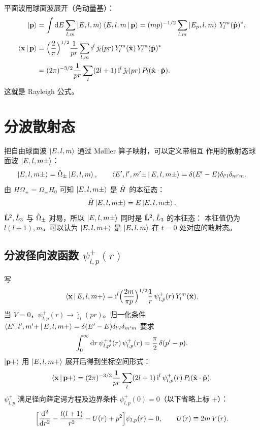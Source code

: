 平面波用球面波展开（角动量基）：
\begin{align}
\ket{\mathbf p}
&= \int\mathrm{d} E\sum_{l,m}\ket{E,l,m}\left\langle E,l,m \,\middle|\, \mathbf p \right\rangle
= (mp)^{-1/2}\sum_{l,m}\ket{E_p,l,m}\,Y_l^m(\hat{\mathbf p})^*,\\
\left\langle \mathbf x \,\middle|\, \mathbf p \right\rangle
&= \Bigl(\frac{2}{\pi}\Bigr)^{1/2}\frac{1}{pr}
\sum_{l,m}\mathrm{i}^l\,\hat\jmath_l(pr)\,Y_l^m(\hat{\mathbf x})\,Y_l^m(\hat{\mathbf p})^*\\
&= (2\pi)^{-3/2}\frac{1}{pr}\sum_l (2l+1)\,\mathrm{i}^l\,
   \hat\jmath_l(pr)\,P_l(\hat{\mathbf x}\cdot\hat{\mathbf p}).
\label{eq:Rayleigh}
\end{align}
这就是 Rayleigh 公式。

\section{分波散射态}\label{sec:pw-states}

把自由球面波 $\ket{E,l,m}$ 通过 Mølller 算子映射，可以定义带相互
作用的散射态球面波 $\ket{E,l,m\pm}$：
\begin{equation}
\ket{E,l,m\pm}=\hat{\Omega}_\pm \ket{E,l,m},
\qquad
\left\langle E',l',m'\pm \,\middle|\, E,l,m\pm \right\rangle=\delta(E'-E)\delta_{l'l}\delta_{m'm}.
\end{equation}
由 $H\Omega_\pm=\Omega_\pm H_0$ 可知 $\ket{E,l,m\pm}$ 是 $\hat{H}$
的本征态：
\[ \hat{H}\ket{E,l,m\pm}=E\ket{E,l,m\pm}.\]
$\hat{\mathbf L}^2,\hat{L}_3$ 与 $\hat{\Omega}_\pm$ 对易，所以
$\ket{E,l,m\pm}$ 同时是 $\hat{\mathbf L}^2,\hat{L}_3$ 的本征态：
本征值仍为 $l(l+1),m$。可以认为 $\ket{E,l,m+}$ 是
$\ket{E,l,m}$ 在 $t=0$ 处对应的散射态。

\subsection{分波径向波函数 $\psi_{l,p}^{+}(r)$}

写
\begin{equation}\label{eq:Elm-plus-x}
\left\langle \mathbf x \,\middle|\, E,l,m+ \right\rangle
= \mathrm{i}^l \Bigl(\frac{2m}{\pi p}\Bigr)^{1/2}\frac{1}{r}\,
   \psi_{l,p}^{+}(r)\,Y_l^m(\hat{\mathbf x}).
\end{equation}
当 $V=0$，$\psi_{l,p}^{+}(r)\to\hat\jmath_l(pr)$。归一化条件
$\left\langle E',l',m'+ \,\middle|\, E,l,m+ \right\rangle=\delta(E'-E)\delta_{l'l}\delta_{m'm}$
要求
\begin{equation}\label{eq:psi-norm}
\int_0^\infty \mathrm{d} r\,\psi_{l,p'}^{+\,*}(r)\,\psi_{l,p}^{+}(r)
=\frac{\pi}{2}\,\delta(p'-p).
\end{equation}
$\ket{\mathbf p+}$ 用 $\ket{E,l,m+}$ 展开后得到坐标空间形式：
\begin{equation}\label{eq:xpplus}
\left\langle \mathbf x \,\middle|\, \mathbf p+ \right\rangle
= (2\pi)^{-3/2}\frac{1}{pr}\sum_l (2l+1)\,\mathrm{i}^l\,
\psi_{l,p}^{+}(r)\,P_l(\hat{\mathbf x}\cdot\hat{\mathbf p}).
\end{equation}
$\psi_{l,p}^{+}$ 满足径向薛定谔方程及边界条件
$\psi_{l,p}^{+}(0)=0$（以下省略上标 $+$）：
\begin{equation}\label{eq:radial-int}
\Bigl[\frac{\mathrm{d}^2}{\mathrm{d} r^2}-\frac{l(l+1)}{r^2}-U(r)+p^2\Bigr]
\psi_{l,p}(r)=0,\qquad U(r)\equiv 2m\,V(r).
\end{equation}

